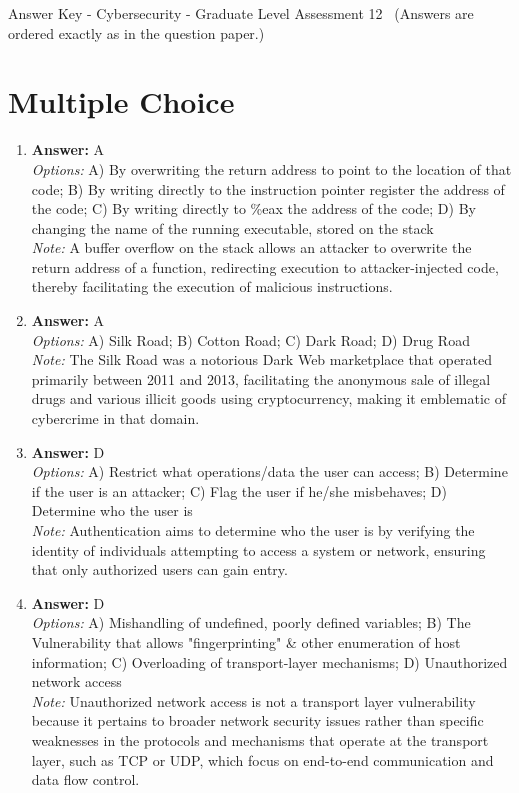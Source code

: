\documentclass[12pt]{article}
\begin{document}
\begin{center}
Answer Key - Cybersecurity - Graduate Level Assessment 12 \
\small (Answers are ordered exactly as in the question paper.)
\end{center}

\section*{Multiple Choice}
\begin{enumerate}[label=\arabic*.]
\item \textbf{Answer:} A
\\ \textit{Options:} A) By overwriting the return address to point to the location of that code; B) By writing directly to the instruction pointer register the address of the code; C) By writing directly to \%eax the address of the code; D) By changing the name of the running executable, stored on the stack
\\ \textit{Note:} A buffer overflow on the stack allows an attacker to overwrite the return address of a function, redirecting execution to attacker-injected code, thereby facilitating the execution of malicious instructions.
\item \textbf{Answer:} A
\\ \textit{Options:} A) Silk Road; B) Cotton Road; C) Dark Road; D) Drug Road
\\ \textit{Note:} The Silk Road was a notorious Dark Web marketplace that operated primarily between 2011 and 2013, facilitating the anonymous sale of illegal drugs and various illicit goods using cryptocurrency, making it emblematic of cybercrime in that domain.
\item \textbf{Answer:} D
\\ \textit{Options:} A) Restrict what operations/data the user can access; B) Determine if the user is an attacker; C) Flag the user if he/she misbehaves; D) Determine who the user is
\\ \textit{Note:} Authentication aims to determine who the user is by verifying the identity of individuals attempting to access a system or network, ensuring that only authorized users can gain entry.
\item \textbf{Answer:} D
\\ \textit{Options:} A) Mishandling of undefined, poorly defined variables; B) The Vulnerability that allows "fingerprinting" \& other enumeration of host information; C) Overloading of transport-layer mechanisms; D) Unauthorized network access
\\ \textit{Note:} Unauthorized network access is not a transport layer vulnerability because it pertains to broader network security issues rather than specific weaknesses in the protocols and mechanisms that operate at the transport layer, such as TCP or UDP, which focus on end-to-end communication and data flow control.

\end{enumerate}
\end{document}
